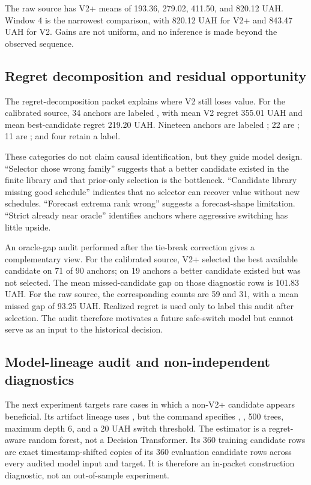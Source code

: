 The raw source has V2+ means of 193.36, 279.02, 411.50, and 820.12 UAH. Window 4 is the narrowest comparison, with 820.12 UAH for V2+ and 843.47 UAH for V2. Gains are not uniform, and no inference is made beyond the observed sequence.

\subsection{Regret decomposition and residual opportunity}

The regret-decomposition packet explains where V2 still loses value. For the calibrated source, 34 anchors are labeled , with mean V2 regret 355.01 UAH and mean best-candidate regret 219.20 UAH. Nineteen anchors are labeled ; 22 are ; 11 are ; and four retain a  label.

These categories do not claim causal identification, but they guide model design. ``Selector chose wrong family'' suggests that a better candidate existed in the finite library and that prior-only selection is the bottleneck. ``Candidate library missing good schedule'' indicates that no selector can recover value without new schedules. ``Forecast extrema rank wrong'' suggests a forecast-shape limitation. ``Strict already near oracle'' identifies anchors where aggressive switching has little upside.

An oracle-gap audit performed after the tie-break correction gives a complementary view. For the calibrated source, V2+ selected the best available candidate on 71 of 90 anchors; on 19 anchors a better candidate existed but was not selected. The mean missed-candidate gap on those diagnostic rows is 101.83 UAH. For the raw source, the corresponding counts are 59 and 31, with a mean missed gap of 93.25 UAH. Realized regret is used only to label this audit after selection. The audit therefore motivates a future safe-switch model but cannot serve as an input to the historical decision.

\subsection{Model-lineage audit and non-independent diagnostics}

The next experiment targets rare cases in which a non-V2+ candidate appears beneficial. Its artifact lineage uses , but the command specifies , , 500 trees, maximum depth 6, and a 20 UAH switch threshold. The estimator is a regret-aware random forest, not a Decision Transformer. Its 360 training candidate rows are exact timestamp-shifted copies of its 360 evaluation candidate rows across every audited model input and target. It is therefore an in-packet construction diagnostic, not an out-of-sample experiment.


